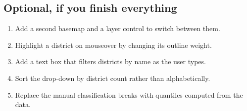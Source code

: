 \documentclass{article}
\begin{document}
\subsection*{Optional, if you finish everything}

\begin{enumerate}
  \item Add a second basemap and a layer control to switch between them.
  \item Highlight a district on mouseover by changing its outline weight.
  \item Add a text box that filters districts by name as the user types.
  \item Sort the drop-down by district count rather than alphabetically.
  \item Replace the manual classification breaks with quantiles computed
        from the data.
\end{enumerate}
\end{document}
